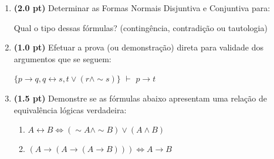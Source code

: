 \documentclass[11pt, a4paper,final]{article}
\begin{document}
\begin{enumerate}

\item {\bf (2.0 pt)} Determinar as Formas Normais Disjuntiva e Conjuntiva para:
Qual o tipo dessas fórmulas? (contingência, contradição ou tautologia)

\item {\bf (1.0 pt)} Efetuar a prova (ou demonstração) direta para validade dos argumentos
que se seguem: 
\begin{comment}
 $\{p\rightarrow \sim q \: , \:\:\: \sim p \rightarrow (r \rightarrow \sim q)  \: , \:\:\:
 (\sim s \vee \sim r)\rightarrow \sim \sim q  \: , \:\:\: \sim s  \} \vdash  r $ \\
\end{comment}
 
$\{p \rightarrow q, q \leftrightarrow s, t \vee (r \wedge \sim s)\}$  {\bf $\vdash $} $p \rightarrow t$


\item {\bf (1.5 pt)} Demonstre se as fórmulas abaixo apresentam uma 
relação de  equivalência lógicas verdadeira:
\begin{enumerate}
\setlength{\itemsep}{-5pt}

\item $A \leftrightarrow B \Leftrightarrow
(\sim A \wedge \sim B)\vee( A \wedge B)$

\item $(A \rightarrow (A \rightarrow (A
\rightarrow B ))) \Leftrightarrow A
\rightarrow B $
\end{enumerate}

\begin{comment} 
\item {\bf (1.0 pt)} Utilizando o método de  {\em demonstração por absurdo} ou {\em indireta},
 demonstre a validade do argumento, a partir das premissas: 
 
 \\
1. $  p \rightarrow  q $ \\
2. $ q \rightarrow r $ \\
3. $ r \rightarrow p $ \\
4. $ p \rightarrow \sim r $ \\
Isto é, esta sequência deduz ( $\vdash $, consiste
de um teorema) $ \sim p \wedge \sim r$?


\end{comment}
\end{enumerate}
\end{document}
